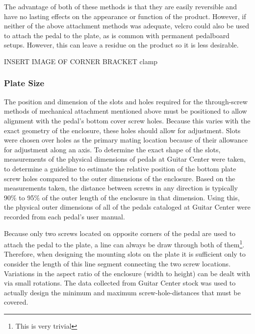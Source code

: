 		The advantage of both of these methods is that they are easily reversible and have no lasting effects on the appearance or function of the product.  However, if neither of the above attachment methods was adequate, velcro could also be used to attach the pedal to the plate, as is common with permanent pedalboard setups.  However, this can leave a residue on the product so it is less desirable.

		\Huge INSERT IMAGE OF CORNER BRACKET clamp \\
		\normalsize

		\subsubsection{Plate Size}

		The position and dimension of the slots and holes required for the through-screw methods of mechanical attachment mentioned above must be positioned to allow alignment with the pedal's bottom cover screw holes.  Because this varies with the exact geometry of the enclosure, these holes should allow for adjustment.  Slots were chosen over holes as the primary mating location because of their allowance for adjustment along an axis.  To determine the exact shape of the slots, measurements of the physical dimensions of pedals at Guitar Center were taken, to determine a guideline to estimate the relative position of the bottom plate screw holes compared to the outer dimensions of the enclosure.  Based on the measurements taken, the distance between screws in any direction is typically 90\% to 95\% of the outer length of the enclosure in that dimension.  Using this, the physical outer dimensions of all of the pedals cataloged at Guitar Center were recorded from each pedal's user manual.

		Because only two screws located on opposite corners of the pedal are used to attach the pedal to the plate, a line can always be draw through both of them\footnote{This is very trivial}.  Therefore, when designing the mounting slots on the plate it is sufficient only to consider the length of this line segment connecting the two screw locations.  Variations in the aspect ratio of the enclosure (width to height) can be dealt with via small rotations.  The data collected from Guitar Center stock was used to actually design the minimum and maximum screw-hole-distances that must be covered.

